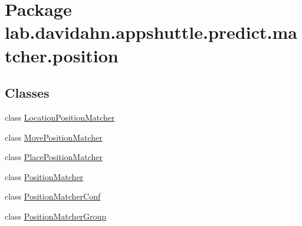 \hypertarget{namespacelab_1_1davidahn_1_1appshuttle_1_1predict_1_1matcher_1_1position}{\section{\-Package lab.\-davidahn.\-appshuttle.\-predict.\-matcher.\-position}
\label{namespacelab_1_1davidahn_1_1appshuttle_1_1predict_1_1matcher_1_1position}
}
\subsection*{\-Classes}
\begin{DoxyCompactItemize}
\item 
class \hyperlink{classlab_1_1davidahn_1_1appshuttle_1_1predict_1_1matcher_1_1position_1_1_location_position_matcher}{\-Location\-Position\-Matcher}
\item 
class \hyperlink{classlab_1_1davidahn_1_1appshuttle_1_1predict_1_1matcher_1_1position_1_1_move_position_matcher}{\-Move\-Position\-Matcher}
\item 
class \hyperlink{classlab_1_1davidahn_1_1appshuttle_1_1predict_1_1matcher_1_1position_1_1_place_position_matcher}{\-Place\-Position\-Matcher}
\item 
class \hyperlink{classlab_1_1davidahn_1_1appshuttle_1_1predict_1_1matcher_1_1position_1_1_position_matcher}{\-Position\-Matcher}
\item 
class \hyperlink{classlab_1_1davidahn_1_1appshuttle_1_1predict_1_1matcher_1_1position_1_1_position_matcher_conf}{\-Position\-Matcher\-Conf}
\item 
class \hyperlink{classlab_1_1davidahn_1_1appshuttle_1_1predict_1_1matcher_1_1position_1_1_position_matcher_group}{\-Position\-Matcher\-Group}
\end{DoxyCompactItemize}

